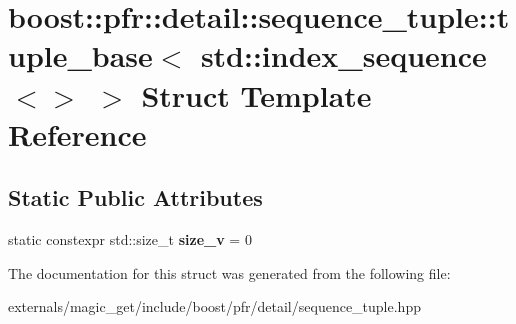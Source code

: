 \hypertarget{structboost_1_1pfr_1_1detail_1_1sequence__tuple_1_1tuple__base_3_01std_1_1index__sequence_3_4_01_4}{}\section{boost\+:\+:pfr\+:\+:detail\+:\+:sequence\+\_\+tuple\+:\+:tuple\+\_\+base$<$ std\+:\+:index\+\_\+sequence$<$$>$ $>$ Struct Template Reference}
\label{structboost_1_1pfr_1_1detail_1_1sequence__tuple_1_1tuple__base_3_01std_1_1index__sequence_3_4_01_4}
\subsection*{Static Public Attributes}
\begin{DoxyCompactItemize}
\item 
\mbox{\label{structboost_1_1pfr_1_1detail_1_1sequence__tuple_1_1tuple__base_3_01std_1_1index__sequence_3_4_01_4_a5fb80b9d1d909afcd1f0e2c7aeed25be}} 
static constexpr std\+::size\+\_\+t {\bfseries size\+\_\+v} = 0
\end{DoxyCompactItemize}


The documentation for this struct was generated from the following file\+:\begin{DoxyCompactItemize}
\item 
externals/magic\+\_\+get/include/boost/pfr/detail/sequence\+\_\+tuple.\+hpp\end{DoxyCompactItemize}
